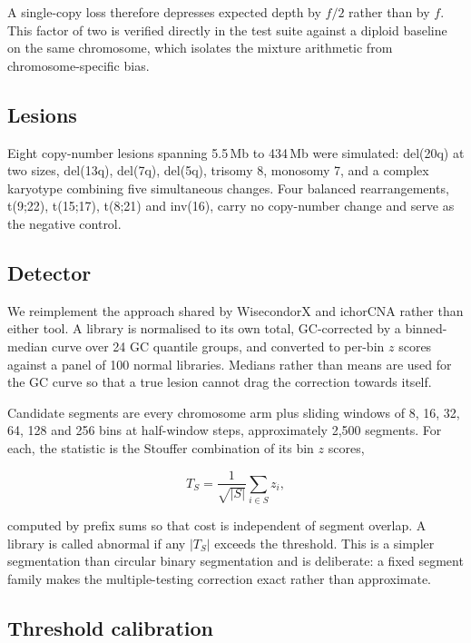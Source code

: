 \documentclass[conference]{IEEEtran}
\begin{document}
A single-copy loss therefore depresses expected depth by $f/2$ rather than by
$f$. This factor of two is verified directly in the test suite against a
diploid baseline on the same chromosome, which isolates the mixture arithmetic
from chromosome-specific bias.

\subsection{Lesions}

Eight copy-number lesions spanning 5.5\,Mb to 434\,Mb were simulated: del(20q)
at two sizes, del(13q), del(7q), del(5q), trisomy 8, monosomy 7, and a complex
karyotype combining five simultaneous changes. Four balanced rearrangements,
t(9;22), t(15;17), t(8;21) and inv(16), carry no copy-number change and serve
as the negative control.

\subsection{Detector}

We reimplement the approach shared by WisecondorX and ichorCNA rather than
either tool. A library is normalised to its own total, GC-corrected by a
binned-median curve over 24 GC quantile groups, and converted to per-bin
$z$ scores against a panel of 100 normal libraries. Medians rather than means
are used for the GC curve so that a true lesion cannot drag the correction
towards itself.

Candidate segments are every chromosome arm plus sliding windows of 8, 16, 32,
64, 128 and 256 bins at half-window steps, approximately 2{,}500 segments. For
each, the statistic is the Stouffer combination \cite{stouffer1949american} of
its bin $z$ scores,

\begin{equation}
T_S = \frac{1}{\sqrt{|S|}} \sum_{i \in S} z_i ,
\label{eq:stouffer}
\end{equation}

computed by prefix sums so that cost is independent of segment overlap. A
library is called abnormal if any $|T_S|$ exceeds the threshold. This is a
simpler segmentation than circular binary segmentation
\cite{olshen2004cbs} and is deliberate: a fixed segment family makes the
multiple-testing correction exact rather than approximate.

\subsection{Threshold calibration}
\end{document}
